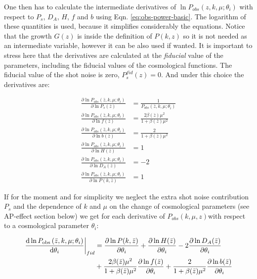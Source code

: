 One then has to calculate the intermediate derivatives of $\ln P_{obs}(z,k,\mu;\theta_{i})$
with respect to $P_{s}$, $D_{A}$, $H$, $f$ and $b$ using Eqn.
\ref{eq:obs-power-basic}. The logarithm of these quantities is used,
because it simplifies considerably the equations. Notice that the
growth $G(z)$ is inside the definition of $P(k,z)$ so it is not
needed as an intermediate variable, however it can be also used if
wanted. It is important to stress here that the derivatives are calculated
at the \emph{fiducial} value of the parameters, including the fiducial
values of the cosmological functions. The fiducial value of the shot
noise is zero, $P_{s}^{fid}(z)=0$. And under this choice the derivatives
are:

\begin{subequations}
	
	\begin{align}
	\frac{\partial\ln P_{obs}\left(\bar{z},k,\mu;\theta_{i}\right)}{\partial\ln P_{s}(\bar{z})} & =\frac{1}{P_{obs}\left(\bar{z},k,\mu;\theta_{i}\right)}\\
	\frac{\partial\ln P_{obs}\left(\bar{z},k,\mu;\theta_{i}\right)}{\partial\ln f(\bar{z})} & =\frac{2\beta(\bar{z})\mu^{2}}{1+\beta(\bar{z})\mu^{2}}\\
	\frac{\partial\ln P_{obs}\left(\bar{z},k,\mu;\theta_{i}\right)}{\partial\ln b(\bar{z})} & =\frac{2}{1+\beta(\bar{z})\mu^{2}}\\
	\frac{\partial\ln P_{obs}\left(\bar{z},k,\mu;\theta_{i}\right)}{\partial\ln H(\bar{z})} & =1\\
	\frac{\partial\ln P_{obs}\left(\bar{z},k,\mu;\theta_{i}\right)}{\partial\ln D_{A}(\bar{z})} & =-2\\
	\frac{\partial\ln P_{obs}\left(\bar{z},k,\mu;\theta_{i}\right)}{\partial\ln P(k,\bar{z})} & =1
	\end{align}
	\label{eq: partial-derivs-subeqns}
	
\end{subequations}

If for the moment and for simplicity we neglect the extra shot noise
contribution $P_{s}$ and the dependence of $k$ and $\mu$ on the
change of cosmological parameters (see AP-effect section below) we
get for each derivative of $P_{obs}(k,\mu,z)$with respect to a cosmological
parameter $\theta_{i}$:

\begin{align}
\left.\frac{\mbox{d}\ln P_{{\rm obs}}\left(\bar{z},k,\mu;\theta_{i}\right)}{\mbox{d}\theta_{i}}\right|_{fid} & =\frac{\partial\ln P(k,\bar{z})}{\partial\theta_{i}}+\frac{\partial\ln H(\bar{z})}{\partial\theta_{i}}-2\frac{\partial\ln D_{A}(\bar{z})}{\partial\theta_{i}}\nonumber \\
& +\frac{2\beta(\bar{z})\mu^{2}}{1+\beta(\bar{z})\mu^{2}}\frac{\partial\ln f(\bar{z})}{\partial\theta_{i}}+\frac{2}{1+\beta(\bar{z})\mu^{2}}\frac{\partial\ln b(\bar{z})}{\partial\theta_{i}}\label{eq:derivatives-of-lnPobs-simplified-1}
\end{align}



